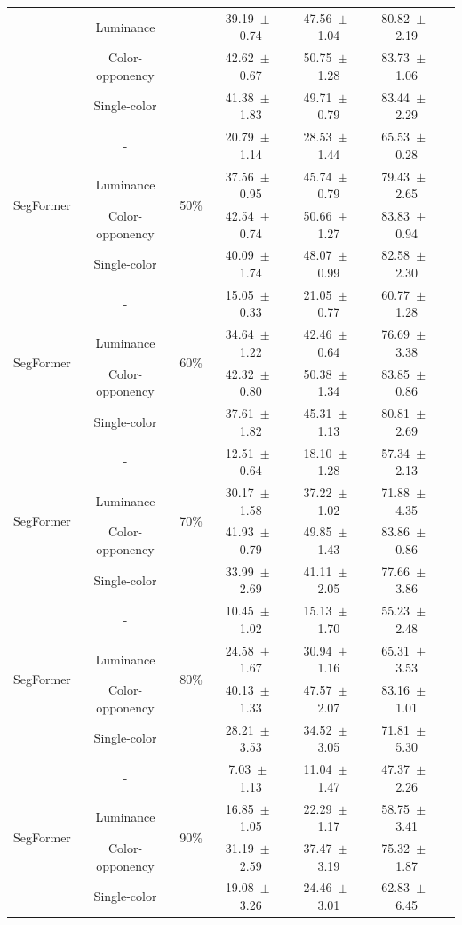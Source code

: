 \begin{table}[h]
\begin{tabular}{@{}lccc ccc@{}}
& Luminance & & 39.19~$\pm$~0.74 & 47.56~$\pm$~1.04 & 80.82~$\pm$~2.19 \\
& Color-opponency & & 42.62~$\pm$~0.67 & 50.75~$\pm$~1.28 & 83.73~$\pm$~1.06 \\
& Single-color & & 41.38~$\pm$~1.83 & 49.71~$\pm$~0.79 & 83.44~$\pm$~2.29 \\
\midrule
\multirow{4}{*}{SegFormer} & - & \multirow{4}{*}{50\%} & 20.79~$\pm$~1.14 & 28.53~$\pm$~1.44 & 65.53~$\pm$~0.28 \\
& Luminance & & 37.56~$\pm$~0.95 & 45.74~$\pm$~0.79 & 79.43~$\pm$~2.65 \\
& Color-opponency & & 42.54~$\pm$~0.74 & 50.66~$\pm$~1.27 & 83.83~$\pm$~0.94 \\
& Single-color & & 40.09~$\pm$~1.74 & 48.07~$\pm$~0.99 & 82.58~$\pm$~2.30 \\
\midrule
\multirow{4}{*}{SegFormer} & - & \multirow{4}{*}{60\%} & 15.05~$\pm$~0.33 & 21.05~$\pm$~0.77 & 60.77~$\pm$~1.28 \\
& Luminance & & 34.64~$\pm$~1.22 & 42.46~$\pm$~0.64 & 76.69~$\pm$~3.38 \\
& Color-opponency & & 42.32~$\pm$~0.80 & 50.38~$\pm$~1.34 & 83.85~$\pm$~0.86 \\
& Single-color & & 37.61~$\pm$~1.82 & 45.31~$\pm$~1.13 & 80.81~$\pm$~2.69 \\
\midrule
\multirow{4}{*}{SegFormer} & - & \multirow{4}{*}{70\%} & 12.51~$\pm$~0.64 & 18.10~$\pm$~1.28 & 57.34~$\pm$~2.13 \\
& Luminance & & 30.17~$\pm$~1.58 & 37.22~$\pm$~1.02 & 71.88~$\pm$~4.35 \\
& Color-opponency & & 41.93~$\pm$~0.79 & 49.85~$\pm$~1.43 & 83.86~$\pm$~0.86 \\
& Single-color & & 33.99~$\pm$~2.69 & 41.11~$\pm$~2.05 & 77.66~$\pm$~3.86 \\
\midrule
\multirow{4}{*}{SegFormer} & - & \multirow{4}{*}{80\%} & 10.45~$\pm$~1.02 & 15.13~$\pm$~1.70 & 55.23~$\pm$~2.48 \\
& Luminance & & 24.58~$\pm$~1.67 & 30.94~$\pm$~1.16 & 65.31~$\pm$~3.53 \\
& Color-opponency & & 40.13~$\pm$~1.33 & 47.57~$\pm$~2.07 & 83.16~$\pm$~1.01 \\
& Single-color & & 28.21~$\pm$~3.53 & 34.52~$\pm$~3.05 & 71.81~$\pm$~5.30 \\
\midrule
\multirow{4}{*}{SegFormer} & - & \multirow{4}{*}{90\%} & 7.03~$\pm$~1.13 & 11.04~$\pm$~1.47 & 47.37~$\pm$~2.26 \\
& Luminance & & 16.85~$\pm$~1.05 & 22.29~$\pm$~1.17 & 58.75~$\pm$~3.41 \\
& Color-opponency & & 31.19~$\pm$~2.59 & 37.47~$\pm$~3.19 & 75.32~$\pm$~1.87 \\
& Single-color & & 19.08~$\pm$~3.26 & 24.46~$\pm$~3.01 & 62.83~$\pm$~6.45 \\
\midrule
\bottomrule
\end{tabular}
\label{tab:sparse_results_segformer_acdc_snow}
\end{table}